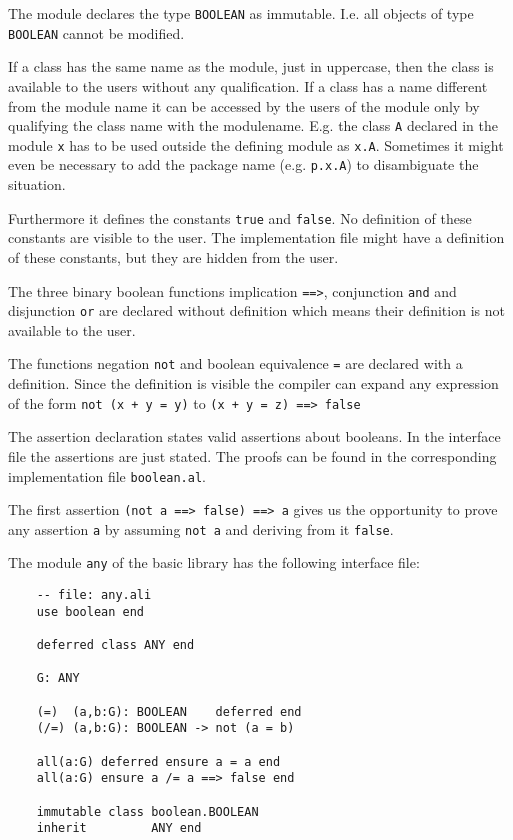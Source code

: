 The module declares the type \lstinline!BOOLEAN! as immutable. I.e. all
objects of type \lstinline!BOOLEAN! cannot be modified.

If a class has the same name as the module, just in uppercase, then the class
is available to the users without any qualification. If a class has a name
different from the module name it can be accessed by the users of the module
only by qualifying the class name with the modulename. E.g. the class
\lstinline!A! declared in the module \lstinline!x! has to be used outside the
defining module as \lstinline!x.A!. Sometimes it might even be necessary to
add the package name (e.g. \lstinline!p.x.A!) to disambiguate the situation.

Furthermore it defines the constants \lstinline!true! and
\lstinline!false!. No definition of these constants are visible to the
user. The implementation file might have a definition of these constants, but
they are hidden from the user.

The three binary boolean functions implication \lstinline!==>!, conjunction
\lstinline!and! and disjunction \lstinline!or! are declared without definition
which means their definition is not available to the user.

The functions negation \lstinline!not! and boolean equivalence \lstinline!=!
are declared with a definition. Since the definition is visible the compiler
can expand any expression of the form \lstinline!not (x + y = y)! to
\lstinline!(x + y = z) ==> false!

The assertion declaration states valid assertions about booleans. In the
interface file the assertions are just stated. The proofs can be found in the
corresponding implementation file \lstinline!boolean.al!.

The first assertion \lstinline!(not a ==> false) ==> a! gives us the
opportunity to prove any assertion \lstinline!a! by assuming \lstinline!not a!
and deriving from it \lstinline!false!.


The module \lstinline!any! of the basic library has the following interface file:

\begin{lstlisting}
    -- file: any.ali
    use boolean end

    deferred class ANY end

    G: ANY

    (=)  (a,b:G): BOOLEAN    deferred end
    (/=) (a,b:G): BOOLEAN -> not (a = b)

    all(a:G) deferred ensure a = a end
    all(a:G) ensure a /= a ==> false end

    immutable class boolean.BOOLEAN
    inherit         ANY end
\end{lstlisting}

